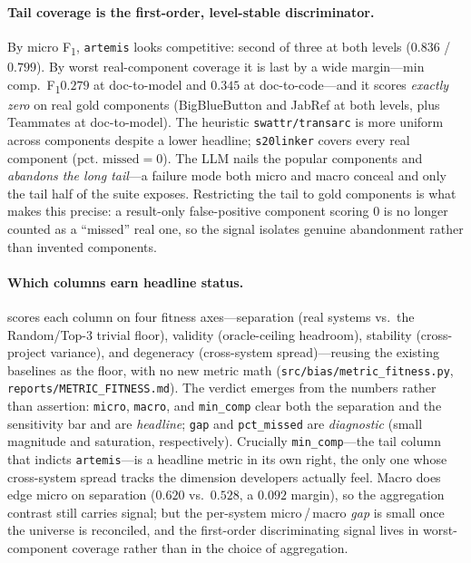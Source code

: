 \documentclass[11pt,a4paper]{report}
\newcommand{\fone}{F\textsubscript{1}\xspace}
\begin{document}
\paragraph{Tail coverage is the first-order, level-stable discriminator.}
By micro \fone, \texttt{artemis} looks competitive: second of three at both
levels ($0.836$ / $0.799$). By worst real-component coverage it is last by a
wide margin---min comp.\ \fone $0.279$ at doc-to-model and $0.345$ at
doc-to-code---and it scores \emph{exactly zero} on real gold components
(BigBlueButton and JabRef at both levels, plus Teammates at doc-to-model). The
heuristic \texttt{swattr/transarc} is more uniform across components despite a
lower headline; \texttt{s20linker} covers every real component
($\text{pct.\ missed}=0$). The LLM nails the popular components and
\emph{abandons the long tail}---a failure mode both micro and macro conceal and
only the tail half of the suite exposes. Restricting the tail to gold components
is what makes this precise: a result-only false-positive component scoring $0$
is no longer counted as a ``missed'' real one, so the signal isolates genuine
abandonment rather than invented components.

\paragraph{Which columns earn headline status.}  scores
each column on four fitness axes---separation (real systems vs.\ the
Random/Top-3 trivial floor), validity (oracle-ceiling headroom), stability
(cross-project variance), and degeneracy (cross-system spread)---reusing the
existing baselines as the floor, with no new metric math
(\texttt{src/bias/metric\_fitness.py}, \texttt{reports/METRIC\_FITNESS.md}). The
verdict emerges from the numbers rather than assertion: \texttt{micro},
\texttt{macro}, and \texttt{min\_comp} clear both the separation and the
sensitivity bar and are \emph{headline}; \texttt{gap} and \texttt{pct\_missed}
are \emph{diagnostic} (small magnitude and saturation, respectively). Crucially
\texttt{min\_comp}---the tail column that indicts \texttt{artemis}---is a
headline metric in its own right, the only one whose cross-system spread tracks
the dimension developers actually feel. Macro does edge micro on separation
($0.620$ vs.\ $0.528$, a $0.092$ margin), so the aggregation contrast still
carries signal; but the per-system micro\,/\,macro \emph{gap} is small once the
universe is reconciled, and the first-order discriminating signal lives in
worst-component coverage rather than in the choice of aggregation.


\end{document}

